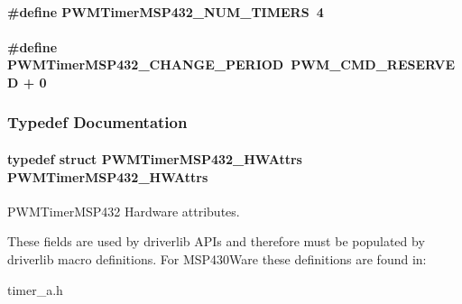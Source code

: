 \paragraph[{P\+W\+M\+Timer\+M\+S\+P432\+\_\+\+N\+U\+M\+\_\+\+T\+I\+M\+E\+R\+S}]{\setlength{\rightskip}{0pt plus 5cm}\#define P\+W\+M\+Timer\+M\+S\+P432\+\_\+\+N\+U\+M\+\_\+\+T\+I\+M\+E\+R\+S~4}\label{_p_w_m_timer_m_s_p432_8h_a763d487bae17c79c424242127b53518c}
\paragraph[{P\+W\+M\+Timer\+M\+S\+P432\+\_\+\+C\+H\+A\+N\+G\+E\+\_\+\+P\+E\+R\+I\+O\+D}]{\setlength{\rightskip}{0pt plus 5cm}\#define P\+W\+M\+Timer\+M\+S\+P432\+\_\+\+C\+H\+A\+N\+G\+E\+\_\+\+P\+E\+R\+I\+O\+D~{\bf P\+W\+M\+\_\+\+C\+M\+D\+\_\+\+R\+E\+S\+E\+R\+V\+E\+D} + 0}\label{_p_w_m_timer_m_s_p432_8h_af4889b739a2240171923e90324ddf94b}


\subsubsection{Typedef Documentation}
\paragraph[{P\+W\+M\+Timer\+M\+S\+P432\+\_\+\+H\+W\+Attrs}]{\setlength{\rightskip}{0pt plus 5cm}typedef struct {\bf P\+W\+M\+Timer\+M\+S\+P432\+\_\+\+H\+W\+Attrs}  {\bf P\+W\+M\+Timer\+M\+S\+P432\+\_\+\+H\+W\+Attrs}}\label{_p_w_m_timer_m_s_p432_8h_a63353889735b1371acd138ea0927cefc}


P\+W\+M\+Timer\+M\+S\+P432 Hardware attributes. 

These fields are used by driverlib A\+P\+Is and therefore must be populated by driverlib macro definitions. For M\+S\+P430\+Ware these definitions are found in\+:
\begin{DoxyItemize}
\item timer\+\_\+a.\+h
\end{DoxyItemize}


